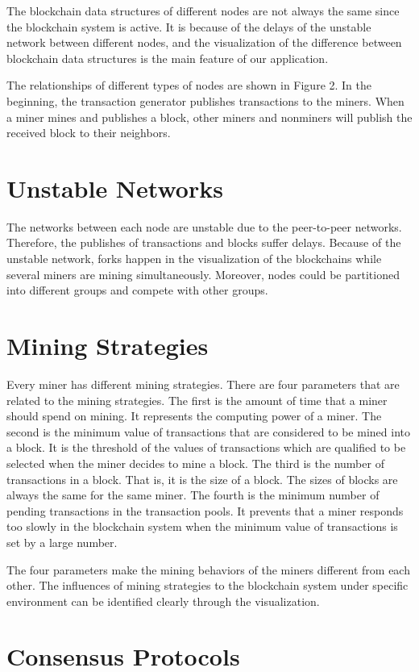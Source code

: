 The blockchain data structures of different nodes are not always the same since the blockchain system is active. It is because of the delays of the unstable network between different nodes, and the visualization of the difference between blockchain data structures is the main feature of our application.

The relationships of different types of nodes are shown in Figure 2. In the beginning, the transaction generator publishes transactions to the miners. When a miner mines and publishes a block, other miners and nonminers will publish the received block to their neighbors.

\section{Unstable Networks}

The networks between each node are unstable due to the peer-to-peer networks. Therefore, the publishes of transactions and blocks suffer delays. Because of the unstable network, forks happen in the visualization of the blockchains while several miners are mining simultaneously. Moreover, nodes could be partitioned into different groups and compete with other groups.

\section{Mining Strategies}

Every miner has different mining strategies. There are four parameters that are related to the mining strategies. The first is the amount of time that a miner should spend on mining. It represents the computing power of a miner. The second is the minimum value of transactions that are considered to be mined into a block. It is the threshold of the values of transactions which are qualified to be selected when the miner decides to mine a block. The third is the number of transactions in a block. That is, it is the size of a block. The sizes of blocks are always the same for the same miner. The fourth is the minimum number of pending transactions in the transaction pools. It prevents that a miner responds too slowly in the blockchain system when the minimum value of transactions is set by a large number.

The four parameters make the mining behaviors of the miners different from each other. The influences of mining strategies to the blockchain system under specific environment can be identified clearly through the visualization.

\section{Consensus Protocols}
